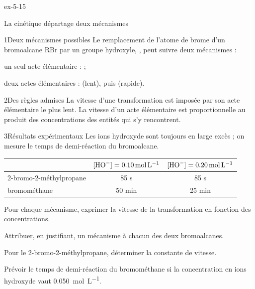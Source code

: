 \begin{blocLivre}{ex-5-15}
\begin{exercice}[3]{La cinétique départage deux mécanismes}
\begin{docu}{1}{Deux mécanismes possibles}
Le remplacement de l'atome de brome d'un bromoalcane RBr par un groupe hydroxyle,
, peut suivre deux mécanismes :
\begin{questions}[label=\otLabel{\Alph*.},leftmargin=1.9em,itemsep=0pt]
\item un seul acte élémentaire :  ;
\item deux actes élémentaires :  (lent), puis  (rapide).
\end{questions}
\end{docu}
\begin{docu}{2}{Des règles admises}
La vitesse d'une transformation est imposée par son acte élémentaire le plus lent. La vitesse d'un acte élémentaire
est proportionnelle au produit des concentrations des entités qui s'y rencontrent.
\end{docu}
\begin{docu}{3}{Résultats expérimentaux}
Les ions hydroxyde sont toujours en large excès ; on mesure le temps de demi-réaction du bromoalcane.
\par\smallskip
{\small\renewcommand{\arraystretch}{1.2}
\begin{tabular}{@{}lcc@{}}\toprule
 & $[\ce{HO-}]=\qty{0,10}{mol.L^{-1}}$ & $[\ce{HO-}]=\qty{0,20}{mol.L^{-1}}$\\\midrule
2-bromo-2-méthylpropane & 85 s & 85 s\\
bromométhane & 50 min & 25 min\\\bottomrule
\end{tabular}}
\end{docu}
\begin{questions}
\item Pour chaque mécanisme, exprimer la vitesse de la transformation en fonction des concentrations.
\item Attribuer, en justifiant, un mécanisme à chacun des deux bromoalcanes.
\item Pour le 2-bromo-2-méthylpropane, déterminer la constante de vitesse.
\item \initiative Prévoir le temps de demi-réaction du bromométhane si la concentration en ions hydroxyde vaut
\qty{0,050}{mol.L^{-1}}.
\end{questions}
\end{exercice}
\end{blocLivre}
